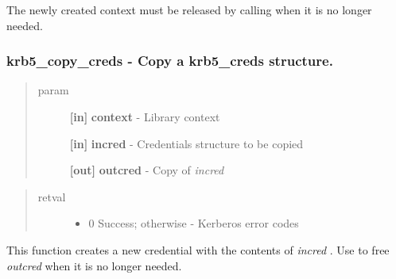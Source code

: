\documentclass[letterpaper,10pt,english]{sphinxmanual}
\begin{document}
The newly created context must be released by calling {\hyperref[appdev/refs/api/krb5_free_context:c.krb5_free_context]{}} when it is no longer needed.


\subsubsection{krb5\_copy\_creds -  Copy a krb5\_creds structure.}
\label{appdev/refs/api/krb5_copy_creds:krb5-copy-creds-copy-a-krb5-creds-structure}\label{appdev/refs/api/krb5_copy_creds::doc}

\begin{fulllineitems}
\label{appdev/refs/api/krb5_copy_creds:c.krb5_copy_creds}
\end{fulllineitems}

\begin{quote}\begin{description}
\item[{param}] \leavevmode
\textbf{{[}in{]}} \textbf{context} - Library context

\textbf{{[}in{]}} \textbf{incred} - Credentials structure to be copied

\textbf{{[}out{]}} \textbf{outcred} - Copy of \emph{incred}

\end{description}\end{quote}
\begin{quote}\begin{description}
\item[{retval}] \leavevmode\begin{itemize}
\item {} 
0   Success; otherwise - Kerberos error codes

\end{itemize}

\end{description}\end{quote}

This function creates a new credential with the contents of \emph{incred} . Use {\hyperref[appdev/refs/api/krb5_free_creds:c.krb5_free_creds]{}} to free \emph{outcred} when it is no longer needed.
\end{document}
